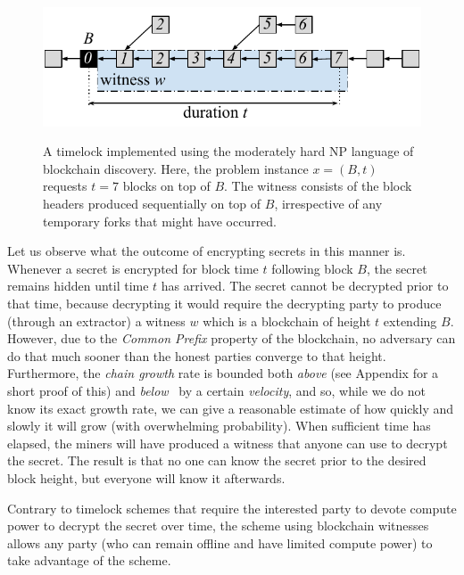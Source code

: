 \begin{figure}[ht]
    \caption{A timelock implemented using the moderately hard \textsc{NP} language of blockchain discovery.
             Here, the problem instance $x = (B, t)$ requests $t = 7$ blocks on top of $B$. The witness
             consists of the block headers produced sequentially on top of $B$, irrespective of any
             temporary forks that might have occurred.}
    \centering
    \includegraphics[width=0.8 \columnwidth,keepaspectratio]{figures/blockchain-timelock.pdf}
    \label{fig.blockchain-timelock}
\end{figure}

Let us observe what the outcome of encrypting secrets in this manner is. Whenever a secret is encrypted
for block time $t$ following block $B$, the secret remains hidden until time $t$ has arrived.
The secret cannot be decrypted prior to that time, because decrypting it would require the decrypting party
to produce (through an extractor) a witness $w$ which is a blockchain of height $t$ extending $B$. However,
due to the \emph{Common Prefix} property of the blockchain, no adversary can do that much sooner than the
honest parties converge to that height. Furthermore, the \emph{chain growth} rate is bounded both \emph{above} (see
Appendix for a short proof of this)
and \emph{below}~\cite{backbone} by a certain \emph{velocity}, and so, while we do not know its exact growth rate, we can give
a reasonable estimate of how quickly and slowly it will grow (with overwhelming probability).
When sufficient time has elapsed, the miners will have produced a witness that anyone can use to decrypt the
secret. The result is that no one can know the secret prior to the desired block height, but everyone will
know it afterwards.

Contrary to timelock schemes that require the interested party to devote compute power to decrypt the secret
over time, the scheme using blockchain witnesses allows any party (who can remain offline and have limited compute
power) to take advantage of the scheme.
